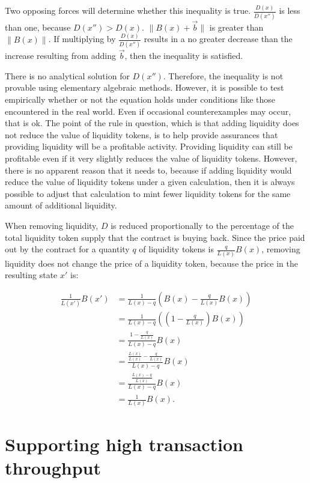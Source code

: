 \documentclass[12pt]{article}
\begin{document}
 Two opposing forces will determine whether this inequality is true. $\frac{D(x)}{D(x'')}$ is less than one, because $D(x'') > D(x)$. $\|B(x) + \vec{b}\|$ is greater than $\|B(x)\|$. If multiplying by $\frac{D(x)}{D(x'')}$ results in a no greater decrease than the increase resulting from adding $\vec{b}$, then the inequality is satisfied.

 There is no analytical solution for $D(x'')$. Therefore, the inequality is not provable using elementary algebraic methods. However, it is possible to test empirically whether or not the equation holds under conditions like those encountered in the real world. Even if occasional counterexamples may occur, that is ok. The point of the rule in question, which is that adding liquidity does not reduce the value of liquidity tokens, is to help provide assurances that providing liquidity will be a profitable activity. Providing liquidity can still be profitable even if it very slightly reduces the value of liquidity tokens. However, there is no apparent reason that it needs to, because if adding liquidity would reduce the value of liquidity tokens under a given calculation, then it is always possible to adjust that calculation to mint fewer liquidity tokens for the same amount of additional liquidity.

When removing liquidity, $D$ is reduced proportionally to the percentage of the total liquidity token supply that the contract is buying back. Since the price paid out by the contract for a quantity $q$ of liquidity tokens is $\frac{q}{L(x)} B(x)$, removing liquidity does not change the price of a liquidity token, because the price in the resulting state $x'$ is:

\begin{equation*}
	\begin{split}
		\frac{1}{L(x')} B(x')  &= \frac{1}{L(x) - q} \left( B(x) - \frac{q}{L(x)} B(x) \right)\\
		&= \frac{1}{L(x) - q} \left( \left(1 - \frac{q}{L(x)} \right) B(x) \right) \\
		&= \frac{1 - \frac{q}{L(x)}}{L(x) - q} B(x) \\
		&= \frac{\frac{L(x)}{L(x)} - \frac{q}{L(x)}}{L(x) - q} B(x) \\
		&= \frac{\frac{L(x) - q}{L(x)}}{L(x) - q} B(x) \\
		&= \frac{1}{L(x)} B(x).
	\end{split}
\end{equation*}


\section{Supporting high transaction throughput}
\end{document}
